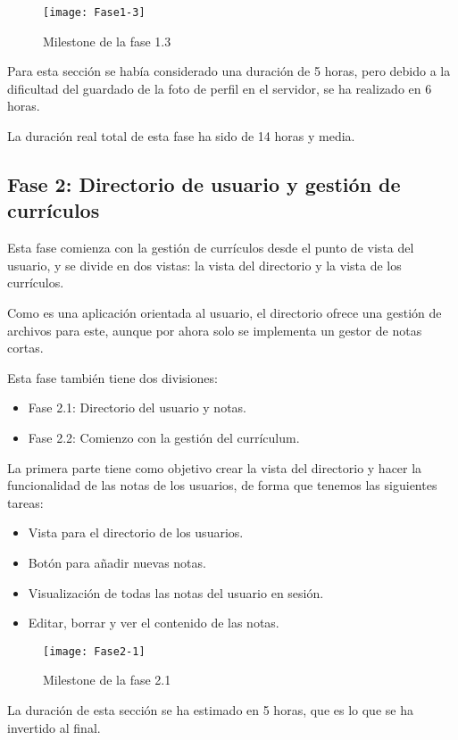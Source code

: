 \begin{figure}
    \centering
    \texttt{[image: Fase1-3]}
    \caption{Milestone de la fase 1.3}
\end{figure}
Para esta sección se había considerado una duración de 5 horas, pero debido a la dificultad del
guardado de la foto de perfil en el servidor, se ha realizado en 6 horas.

La duración real total de esta fase ha sido de 14 horas y media.

\subsection{Fase 2: Directorio de usuario y gestión de currículos}
Esta fase comienza con la gestión de currículos desde el punto de vista del usuario, y se divide
en dos vistas: la vista del directorio y la vista de los currículos.

Como es una aplicación orientada al usuario, el directorio ofrece una gestión de archivos para este,
aunque por ahora solo se implementa un gestor de notas cortas.

Esta fase también tiene dos divisiones:
\begin{itemize}
\tightlist
\item Fase 2.1: Directorio del usuario y notas.
\item Fase 2.2: Comienzo con la gestión del currículum.
\end{itemize}

La primera parte tiene como objetivo crear la vista del directorio y hacer la funcionalidad
de las notas de los usuarios, de forma que tenemos las siguientes tareas:
\begin{itemize}
\tightlist
\item Vista para el directorio de los usuarios.
\item Botón para añadir nuevas notas.
\item Visualización de todas las notas del usuario en sesión.
\item Editar, borrar y ver el contenido de las notas.
\end{itemize}

\begin{figure}
    \centering
    \texttt{[image: Fase2-1]}
    \caption{Milestone de la fase 2.1}
\end{figure}

La duración de esta sección se ha estimado en 5 horas, que es lo que se ha invertido al final.


